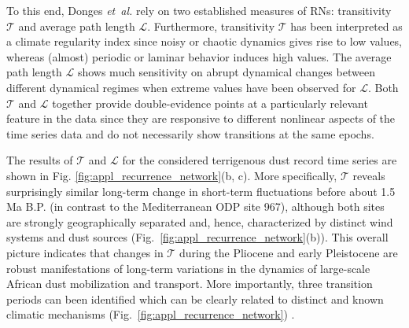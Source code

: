 		To this end, Donges \textit{et~al.} rely on two established measures of RNs: transitivity $\mathcal{T}$ and average path length $\mathcal{L}$. Furthermore, transitivity $\mathcal{T}$ has been interpreted as a climate regularity index since noisy or chaotic dynamics gives rise to low values, whereas (almost) periodic or laminar behavior induces high values. The average path length $\mathcal{L}$ shows much sensitivity on abrupt dynamical changes between different dynamical regimes when extreme values have been observed for $\mathcal{L}$. Both $\mathcal{T}$ and $\mathcal{L}$ together provide double-evidence points at a particularly relevant feature in the data since they are responsive to different nonlinear aspects of the time series data and do not necessarily show transitions at the same epochs.

		The results of $\mathcal{T}$ and $\mathcal{L}$ for the considered terrigenous dust record time series are shown in Fig. \ref{fig:appl_recurrence_network}(b, c). More specifically, $\mathcal{T}$ reveals surprisingly similar long-term change in short-term fluctuations before about 1.5 Ma B.P. (in contrast to the Mediterranean ODP site 967), although both sites are strongly geographically separated and, hence, characterized by distinct wind systems and dust sources (Fig.~\ref{fig:appl_recurrence_network}(b)). This overall picture indicates that changes in $\mathcal{T}$ during the Pliocene and early Pleistocene are robust manifestations of long-term variations in the dynamics of large-scale African dust mobilization and transport. More importantly, three transition periods can been identified which can be clearly related to distinct and known climatic mechanisms (Fig.~\ref{fig:appl_recurrence_network}) \cite{Donges2011a}.

